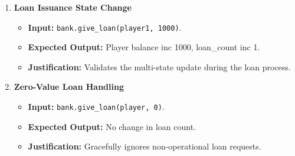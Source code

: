 \documentclass{article}
\begin{document}
\begin{enumerate}
    \item \textbf{Loan Issuance State Change}
    \begin{itemize}
        \item \textbf{Input:} \texttt{bank.give_loan(player1, 1000)}.
        \item \textbf{Expected Output:} Player balance inc 1000, loan\_count inc 1.
        \item \textbf{Justification:} Validates the multi-state update during the loan process.
    \end{itemize}

    \item \textbf{Zero-Value Loan Handling}
    \begin{itemize}
        \item \textbf{Input:} \texttt{bank.give_loan(player, 0)}.
        \item \textbf{Expected Output:} No change in loan count.
        \item \textbf{Justification:} Gracefully ignores non-operational loan requests.
    \end{itemize}
\end{enumerate}
\end{document}
